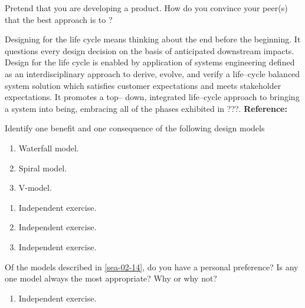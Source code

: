 \begin{exercises}
    \begin{exercise}
    \label{sea-02-12}
        Pretend that you are developing a product. How do you convince your peer(s) that the best approach is to ?
    \end{exercise}
    \begin{solution}
        Designing for the life cycle means thinking about the end before the beginning. It questions every design decision on the basis of anticipated downstream impacts. Design for the life cycle is enabled by application of systems engineering defined as an interdisciplinary approach to derive, evolve, and verify a life–cycle balanced system solution which satisfies customer expectations and meets stakeholder expectations. It promotes a top– down, integrated life–cycle approach to bringing a system into being, embracing all of the phases exhibited in ???. \textbf{Reference:}
    \end{solution}
    
    \begin{exercise}
    \label{sea-02-14} 
        Identify one benefit and one consequence of the following design models
        \begin{enumerate}[label=\alph*)]
            \item Waterfall model.
            \item Spiral model.
            \item V-model.
        \end{enumerate}
    \end{exercise}
    \begin{solution}
        \begin{enumerate}[label=\alph*)]
            \item Independent exercise.
            \item Independent exercise.
            \item Independent exercise.
        \end{enumerate}
    \end{solution}
    
    \begin{exercise}
    \label{sea-02-14_14}
        Of the models described in \ref{sea-02-14}, do you have a personal preference? Is any one model always the most appropriate? Why or why not?
    \end{exercise}
    \begin{solution}
        \begin{enumerate}[label=\alph*)]
            \item Independent exercise.
        \end{enumerate}
    \end{solution}
    

\end{exercises}
